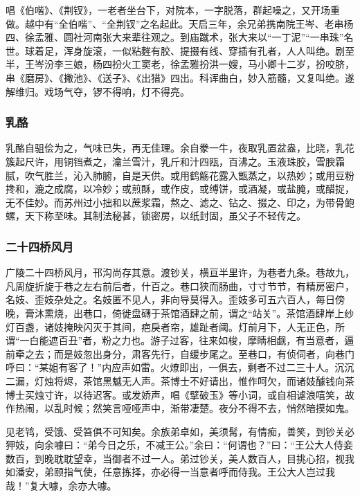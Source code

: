 \documentclass[]{article}
\begin{document}
唱《伯喈》、《荆钗》，一老者坐台下，对院本，一字脱落，群起噪之，又开场重做。越中有``全伯喈''、``全荆钗''之名起此。天启三年，余兄弟携南院王岑、老串杨四、徐孟雅、圆社河南张大来辈往观之。到庙蹴术，张大来以``一丁泥''``一串珠''名世。球着足，浑身旋滚，一似粘麰有胶、提掇有线、穿插有孔者，人人叫绝。剧至半，王岑汾李三娘，杨四扮火工窦老，徐孟雅扮洪一嫂，马小卿十二岁，扮咬脐，串《磨房》、《撇池》、《送子》、《出猎》四出。科诨曲白，妙入筋髓，又复叫绝。遂解维归。戏场气夺，锣不得响，灯不得亮。

\hypertarget{header-n312}{%
\subsubsection{乳酪}\label{header-n312}}

乳酪自驵侩为之，气味已失，再无佳理。余自豢一牛，夜取乳置盆盎，比晓，乳花簇起尺许，用铜铛煮之，瀹兰雪汁，乳斤和汁四瓯，百沸之。玉液珠胶，雪腴霜腻，吹气胜兰，沁入肺腑，自是天供。或用鹤觞花露入甑蒸之，以热妙；或用豆粉搀和，漉之成腐，以冷妙；或煎酥，或作皮，或缚饼，或酒凝，或盐腌，或醋捉，无不佳妙。而苏州过小拙和以蔗浆霜，熬之、滤之、钻之、掇之、印之，为带骨鲍螺，天下称至味。其制法秘甚，锁密房，以纸封固，虽父子不轻传之。

\hypertarget{header-n317}{%
\subsubsection{二十四桥风月}\label{header-n317}}

广陵二十四桥风月，邗沟尚存其意。渡钞关，横亘半里许，为巷者九条。巷故九，凡周旋折旋于巷之左右前后者，什百之。巷口狭而肠曲，寸寸节节，有精房密户，名妓、歪妓杂处之。名妓匿不见人，非向导莫得入。歪妓多可五六百人，每日傍晚，膏沐熏烧，出巷口，倚徙盘礴于茶馆酒肆之前，谓之``站关''。茶馆酒肆岸上纱灯百盏，诸妓掩映闪灭于其间，疤戾者帘，雄趾者阈。灯前月下，人无正色，所谓``一白能遮百丑''者，粉之力也。游子过客，往来如梭，摩睛相觑，有当意者，逼前牵之去；而是妓忽出身分，肃客先行，自缓步尾之。至巷口，有侦伺者，向巷门呼曰：``某姐有客了！''内应声如雷。火燎即出，一俱去，剩者不过二三十人。沉沉二漏，灯烛将烬，茶馆黑魆无人声。茶博士不好请出，惟作呵欠，而诸妓醵钱向茶博士买烛寸许，以待迟客。或发娇声，唱《擘破玉》等小词，或自相谑浪嘻笑，故作热闹，以乱时候；然笑言哑哑声中，渐带凄楚。夜分不得不去，悄然暗摸如鬼。

见老鸨，受饿、受笞俱不可知矣。余族弟卓如，美须髯，有情痴，善笑，到钞关必狎妓，向余噱曰：``弟今日之乐，不减王公。''余曰：``何谓也？''曰：``王公大人侍妾数百，到晚耽耽望幸，当御者不过一人。弟过钞关，美人数百人，目挑心招，视我如潘安，弟颐指气使，任意拣择，亦必得一当意者呼而侍我。王公大人岂过我哉！''复大噱，余亦大噱。
\end{document}
